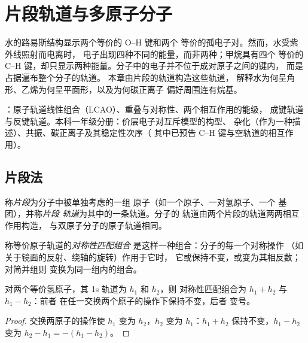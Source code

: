 \chapter{片段轨道与多原子分子}\label{ch:b2:fragment-orbitals}

水的路易斯结构显示两个等价的 O--H 键和两个
等价的孤电子对。然而，水受紫外线照射而电离时，
电子出现四种不同的能量，而非两种；甲烷具有四个
等价的 C--H 键，却只显示两种能量。分子中的电子并不位于成对原子之间的键内，
而是占据遍布整个分子的轨道。
本章由片段的轨道构造这些轨道，
解释水为何呈角形、乙烯为何呈平面形，以及为何碳正离子
偏好周围连有烷基。

\begin{recall}
：原子轨道线性组合（LCAO）、重叠与对称性、两个相互作用的能级，
成键轨道与反键轨道。本科一年级分册：价层电子对互斥模型的构型、
杂化（作为一种描述）、共振、碳正离子及其稳定性次序（
其中已预告 C--H 键与空轨道的相互作用）。
\end{recall}

\section{片段法}

\begin{definition}[片段]\label{def:b2:fragment-orbitals:fragment}
称\emph{片段}为分子中被单独考虑的一组
原子（如一个原子、一对氢原子、一个  基团），并称\emph{片段
轨道}为其中的一条轨道。分子的
轨道由两个片段的轨道两两相互作用构造，
与双原子分子的原子轨道相同。
\end{definition}

\begin{definition}[对称性匹配组合]\label{def:b2:fragment-orbitals:symmetry-adapted}
称等价原子轨道的\emph{对称性匹配组合}
是这样一种组合：分子的每一个对称操作
（如关于镜面的反射、绕轴的旋转）作用于它时，
它或保持不变，或变为其相反数；对简并组则
变换为同一组内的组合。
\end{definition}

\begin{proposition}[两个氢原子]\label{prop:b2:fragment-orbitals:h2-pair}
对两个等价氢原子，其 1s 轨道为 $h_1$ 和 $h_2$，则
对称性匹配组合为 $h_1 + h_2$ 与 $h_1 - h_2$：前者
在任一交换两个原子的操作下保持不变，后者
变号。
\end{proposition}

\begin{proof}
交换两原子的操作使 $h_1$ 变为 $h_2$，$h_2$ 变为
$h_1$：$h_1 + h_2$ 保持不变，$h_1 - h_2$ 变为 $h_2 - h_1 = -(h_1 - h_2)$。
\end{proof}

